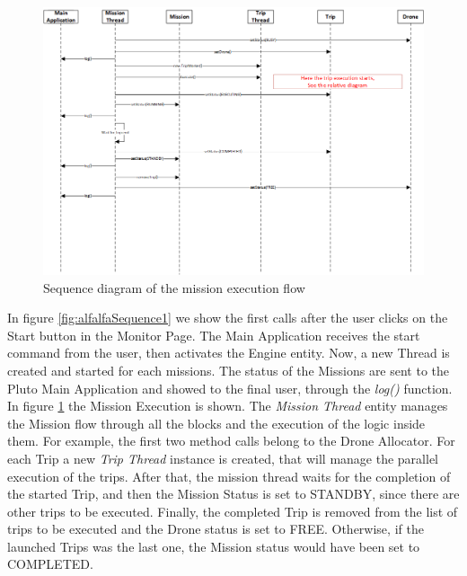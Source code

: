 \begin{figure}[h!]
  \centering
  \includegraphics[width=\linewidth]{pictures/Alfalfa_Sequence_MissionExecution.png}
  \caption{Sequence diagram of the mission execution flow}
  \label{fig:alfalfaSequence2}
\end{figure}

In figure \ref{fig:alfalfaSequence1} we show the first calls after the user clicks on the Start button in the Monitor Page.
The Main Application receives the start command from the user, then activates the Engine entity. Now, a new Thread is created and started for each missions. The status of the Missions are sent to the Pluto Main Application and showed to the final user, through the \textit{log()} function.
\\

In figure \ref{fig:alfalfaSequence2} the Mission Execution is shown.
The \textit{Mission Thread} entity manages the Mission flow through all the blocks and the execution of the logic inside them.
For example, the first two method calls belong to the Drone Allocator. 
For each Trip a new \textit{Trip Thread} instance is created, that will manage the parallel execution of the trips.
After that, the mission thread waits for the completion of the started Trip, and then the Mission Status is set to STANDBY, since there are other trips to be executed.
Finally, the completed Trip is removed from the list of trips to be executed and the Drone status is set to FREE.
Otherwise, if the launched Trips was the last one, the Mission status would have been set to COMPLETED.
\\


